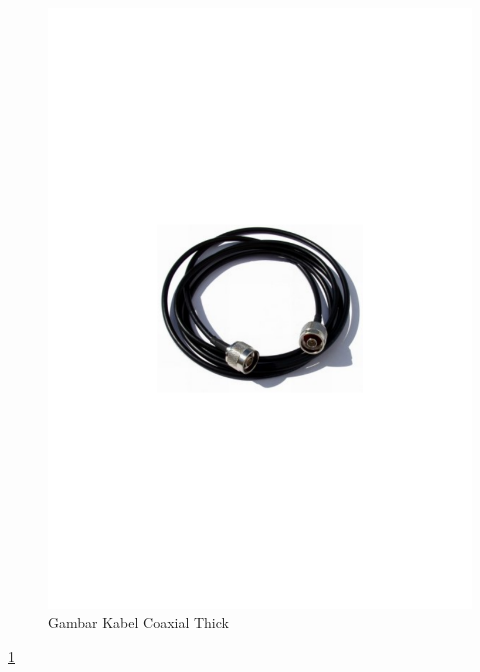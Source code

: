 \begin{figure} [ht]
	\centerline{\includegraphics[width=1\textwidth]{figures/thickcoax.pdf}}
	\caption{Gambar Kabel Coaxial Thick}
	\label{thickcoax}
\end{figure}
	\ref{thickcoax}
	
